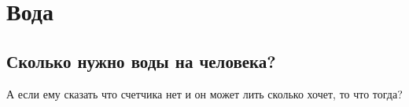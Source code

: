 \part{Вода}
\chapter{Сколько нужно воды на человека?}
А если ему сказать что счетчика нет и он может лить сколько хочет, то что тогда?
